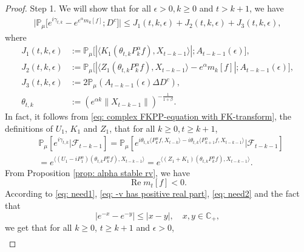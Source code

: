 \documentclass[12pt,a4paper]{amsart}
\theoremstyle{plain}
\theoremstyle{definition}
\numberwithin{equation}{section}
\begin{document}
\begin{proof}
    Step 1. We will show that for all $\epsilon > 0, k\geq 0$ and $t>k+1$, we have
\begin{equation}\begin{split}
    \big|\mathbb{P}_{\mu}\big[e^{i\gamma_{t,k}}-e^{e^{\alpha}m_k[f]}; D^c\big]\big|
    \leq J_1(t,k,\epsilon)+J_2(t,k,\epsilon)+J_3(t,k,\epsilon),
\end{split}\end{equation}
    where
\begin{equation}\begin{split}
\label{eq: Def of Ji}
    J_1(t,k,\epsilon)
    &:= \mathbb{P}_{\mu}\big[|\langle K_1(\theta_{t,k}P^\alpha_k f), X_{t-k-1}\rangle|; A_{t-k-1}(\epsilon) \big],
    \\ J_2(t,k,\epsilon)
    &:= \mathbb{P}_{\mu}\big[|\langle Z_1(\theta_{t,k}P^\alpha_k f),X_{t-k-1}\rangle-e^{\alpha}m_k[f]|; A_{t-k-1}(\epsilon)\big],
    \\ J_3(t,k, \epsilon)
    &:=2\mathbb{P}_{\mu}(A_{t-k-1}(\epsilon)\Delta D^c),
    \\\theta_{t,k}
    &:= (e^{\alpha k}\|X_{t-k-1}\|)^{-\frac{1}{1+\beta}}.
\end{split}\end{equation}
    In fact, it follows from \eqref{eq: complex FKPP-equation with FK-transform}, the definitions of $U_1$, $K_1$ and $Z_1$, that for all $k\geq 0, t\geq k+1$,
\begin{equation}\begin{split}
\label{eq: need1}
    &\mathbb{P}_{\mu}[e^{i\gamma_{t,k}}|\mathscr{F}_{t-k-1}]
    =\mathbb{P}_{\mu}[e^{i\theta_{t,k}\langle P^\alpha_k f,X_{t-k}\rangle-i\theta_{t,k}\langle P^\alpha_{k+1} f, X_{t-k-1}\rangle}|\mathscr{F}_{t-k-1}]
    \\&=e^{\langle (U_1 - iP^\alpha_1 ) (\theta_{t,k}P^\alpha_k f),X_{t-k-1}\rangle}
    =e^{\langle (Z_1 + K_1) (\theta_{t,k}P^\alpha_k f),X_{t-k-1}\rangle}.
\end{split}\end{equation}
    From Proposition \ref{prop: alpha stable rv}, we have
\begin{equation}
\label{eq: need2}
    \operatorname {Re} m_t[f] < 0.
\end{equation}
    According to \eqref{eq: need1}, \eqref{eq: -v has positive real part}, \eqref{eq: need2} and the fact that
\[
    |e^{-x} - e^{-y}| \leq |x-y|,\quad x,y \in \mathbb C_+,
\]
    we get that for all $k\geq 0$, $t\geq k+1$ and $\epsilon> 0$,
\begin{equation}\begin{split}

\end{split}
\end{equation}
\end{proof}
\end{document}
